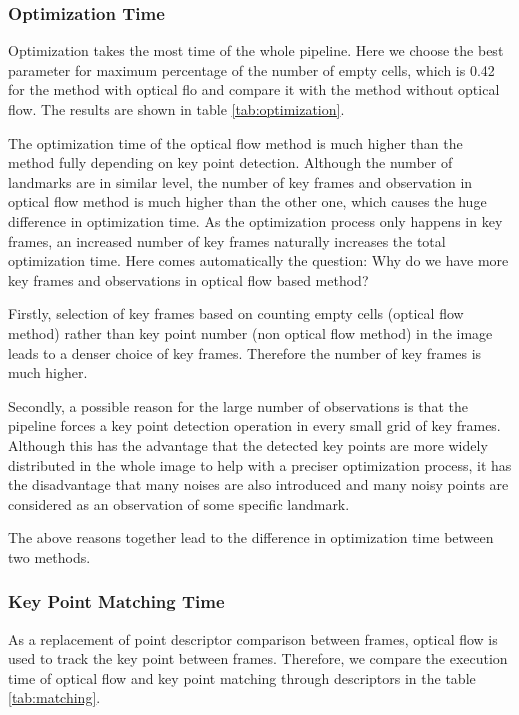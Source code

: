 \documentclass[11pt]{easychair}
\begin{document}
\subsubsection{Optimization Time}
Optimization takes the most time of the whole pipeline. Here we choose the best parameter for maximum percentage of the number of empty cells, which is 0.42 for the method with optical flo and compare it with the method without optical flow. The results are shown in table \ref{tab:optimization}.

The optimization time of the optical flow method is much higher than the method fully depending on key point detection. Although the number of landmarks are in similar level, the number of key frames and observation in optical flow method is much higher than the other one, which causes the huge difference in optimization time. As the optimization process only happens in key frames, an increased number of key frames naturally increases the total optimization time. Here comes automatically the question: Why do we have more key frames and observations in optical flow based method?

Firstly, selection of key frames based on counting empty cells (optical flow method) rather than key point number (non optical flow method) in the image leads to a denser choice of key frames. Therefore the number of key frames is much higher.

Secondly, a possible reason for the large number of observations is that the pipeline forces a key point detection operation in every small grid of key frames. Although this has the advantage that the detected key points are more widely distributed in the whole image to help with a preciser optimization process, it has the disadvantage that many noises are also introduced and many noisy points are considered as an observation of some specific landmark.  

The above reasons together lead to the difference in optimization time between two methods.



\subsubsection{Key Point Matching Time}
As a replacement of point descriptor comparison between frames, optical flow is used to track the key point between frames. Therefore, we compare the execution time of optical flow and key point matching through descriptors in the table \ref{tab:matching}.
\end{document}
